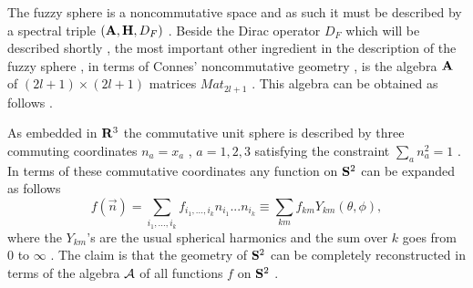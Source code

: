 \documentclass[a4paper,10pt]{article}
\begin{document}
The fuzzy sphere is a noncommutative space and as such it must be
described by a spectral triple $({\bf A},{\bf H},D_F)$ \cite{cmlv}
. Beside the Dirac operator $D_F$ which will be described shortly
, the most important other ingredient in the description of the
fuzzy sphere , in terms of Connes' noncommutative geometry
\cite{cmlv} , is the algebra ${\bf A}$ of $(2l+1){\times}(2l+1)$
matrices $Mat_{2l+1}$ . This algebra can be obtained as follows .

As embedded in ${\bf R}^3$ the commutative unit sphere is
described by three commuting coordinates ${n}_a=x_a$  , $a=1,2,3$
satisfying the constraint $\sum_{a}n_a^2=1$ . In terms of these
commutative coordinates any function on ${\bf S}^2$ can be
expanded as follows
\begin{equation}
{f}(\vec{n})=\sum_{i_1,...,i_k}f_{i_1,...,i_k}n_{i_1}...n_{i_k}{\equiv}\sum_{km}f_{km}Y_{km}(\theta,\phi),
\end{equation}
where the $Y_{km}$'s are the usual spherical harmonics and the
sum over $k$ goes from $0$ to $\infty$ . The claim is that the
geometry of ${\bf S}^2$ can be completely reconstructed in terms
of the algebra ${\cal A}$ of all functions $f$ on ${\bf S}^2$ .
\end{document}
